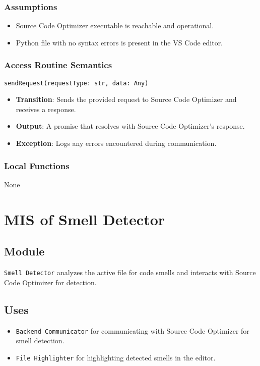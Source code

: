 \documentclass[12pt, titlepage]{article}
\begin{document}
\subsubsection{Assumptions}
\begin{itemize}
\item Source Code Optimizer executable is reachable and operational.
\item Python file with no syntax errors is present in the VS Code editor.
\end{itemize}

\subsubsection{Access Routine Semantics}
\texttt{sendRequest(requestType: str, data: Any)}
\begin{itemize}
\item \textbf{Transition}: Sends the provided request to Source Code Optimizer and receives a response.
\item \textbf{Output}: A promise that resolves with Source Code Optimizer's response.
\item \textbf{Exception}: Logs any errors encountered during communication.
\end{itemize}

\subsubsection{Local Functions}
None

\section{MIS of Smell Detector}

\subsection{Module}
\texttt{Smell Detector} analyzes the active file for code smells and interacts with Source Code Optimizer for detection.

\subsection{Uses}
\begin{itemize}
\item \texttt{Backend Communicator} for communicating with Source Code Optimizer for smell detection.
\item \texttt{File Highlighter} for highlighting detected smells in the editor.
\end{itemize}
\end{document}
